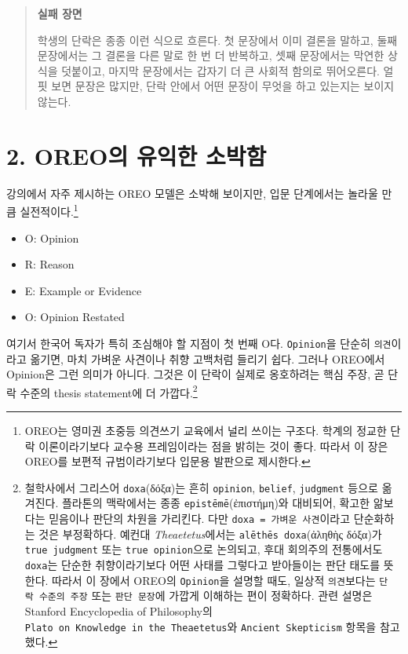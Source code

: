 \begin{quote}
\textbf{실패 장면}

학생의 단락은 종종 이런 식으로 흐른다. 첫 문장에서 이미 결론을 말하고, 둘째 문장에서는 그 결론을 다른 말로 한 번 더 반복하고, 셋째 문장에서는 막연한 상식을 덧붙이고, 마지막 문장에서는 갑자기 더 큰 사회적 함의로 뛰어오른다. 얼핏 보면 문장은 많지만, 단락 안에서 어떤 문장이 무엇을 하고 있는지는 보이지 않는다.
\end{quote}

\section{2. OREO의 유익한 소박함}\label{2-oreouxc758-uxc720uxc775uxd55c-uxc18cuxbc15uxd568}

강의에서 자주 제시하는 OREO 모델은 소박해 보이지만, 입문 단계에서는 놀라울 만큼 실전적이다.\footnote{OREO는 영미권 초중등 의견쓰기 교육에서 널리 쓰이는 구조다. 학계의 정교한 단락 이론이라기보다 교수용 프레임이라는 점을 밝히는 것이 좋다. 따라서 이 장은 OREO를 보편적 규범이라기보다 입문용 발판으로 제시한다.}

\begin{itemize}
\tightlist
\item
  O: Opinion
\item
  R: Reason
\item
  E: Example or Evidence
\item
  O: Opinion Restated
\end{itemize}

여기서 한국어 독자가 특히 조심해야 할 지점이 첫 번째 O다. \texttt{Opinion}을 단순히 \texttt{의견}이라고 옮기면, 마치 가벼운 사견이나 취향 고백처럼 들리기 쉽다. 그러나 OREO에서 Opinion은 그런 의미가 아니다. 그것은 이 단락이 실제로 옹호하려는 핵심 주장, 곧 단락 수준의 thesis statement에 더 가깝다.\footnote{철학사에서 그리스어 \texttt{doxa}(δόξα)는 흔히 \texttt{opinion}, \texttt{belief}, \texttt{judgment} 등으로 옮겨진다. 플라톤의 맥락에서는 종종 \texttt{epistēmē}(ἐπιστήμη)와 대비되어, 확고한 앎보다는 믿음이나 판단의 차원을 가리킨다. 다만 \texttt{doxa\ =\ 가벼운\ 사견}이라고 단순화하는 것은 부정확하다. 예컨대 \emph{Theaetetus}에서는 \texttt{alēthēs\ doxa}(ἀληθὴς δόξα)가 \texttt{true\ judgment} 또는 \texttt{true\ opinion}으로 논의되고, 후대 회의주의 전통에서도 \texttt{doxa}는 단순한 취향이라기보다 어떤 사태를 그렇다고 받아들이는 판단 태도를 뜻한다. 따라서 이 장에서 OREO의 \texttt{Opinion}을 설명할 때도, 일상적 \texttt{의견}보다는 \texttt{단락\ 수준의\ 주장} 또는 \texttt{판단\ 문장}에 가깝게 이해하는 편이 정확하다. 관련 설명은 Stanford Encyclopedia of Philosophy의 \texttt{Plato\ on\ Knowledge\ in\ the\ Theaetetus}와 \texttt{Ancient\ Skepticism} 항목을 참고했다.}

